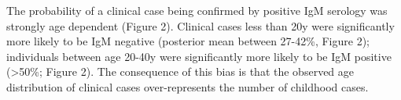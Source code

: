 The probability of a clinical case being confirmed by positive IgM
serology was strongly age dependent (Figure 2). Clinical cases less than
20y were significantly more likely to be IgM negative (posterior mean
between 27-42\%, Figure 2); individuals between age 20-40y were
significantly more likely to be IgM positive (\textgreater{}50\%; Figure
2). The consequence of this bias is that the observed age distribution
of clinical cases over-represents the number of childhood cases.